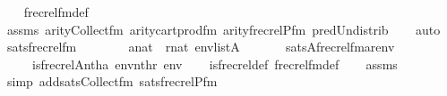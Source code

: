\begin{isabellebody}
%
\isadelimproof
\ \ %
\endisadelimproof
%
\isatagproof
{}\isamarkupfalse%
\ frecrel{\isacharunderscore}{\kern0pt}fm{\isacharunderscore}{\kern0pt}def\isanewline
\ \ \isamarkupfalse%
\ assms\ arity{\isacharunderscore}{\kern0pt}Collect{\isacharunderscore}{\kern0pt}fm\ arity{\isacharunderscore}{\kern0pt}cartprod{\isacharunderscore}{\kern0pt}fm\ arity{\isacharunderscore}{\kern0pt}frecrelP{\isacharunderscore}{\kern0pt}fm\ pred{\isacharunderscore}{\kern0pt}Un{\isacharunderscore}{\kern0pt}distrib\isanewline
\ \ \isamarkupfalse%
\ auto%
\endisatagproof
{\isafoldproof}%
%
\isadelimproof
\isanewline
%
\endisadelimproof
\isanewline
{}\isamarkupfalse%
\ sats{\isacharunderscore}{\kern0pt}frecrel{\isacharunderscore}{\kern0pt}fm\ {\isacharcolon}{\kern0pt}\isanewline
\ \ \isanewline
\ \ \ \ {\isachardoublequoteopen}a{\isasymin}nat{\isachardoublequoteclose}\ \ {\isachardoublequoteopen}r{\isasymin}nat{\isachardoublequoteclose}\ {\isachardoublequoteopen}env{\isasymin}list{\isacharparenleft}{\kern0pt}A{\isacharparenright}{\kern0pt}{\isachardoublequoteclose}\isanewline
\ \ \isanewline
\ \ \ \ {\isachardoublequoteopen}sats{\isacharparenleft}{\kern0pt}A{\isacharcomma}{\kern0pt}frecrel{\isacharunderscore}{\kern0pt}fm{\isacharparenleft}{\kern0pt}a{\isacharcomma}{\kern0pt}r{\isacharparenright}{\kern0pt}{\isacharcomma}{\kern0pt}env{\isacharparenright}{\kern0pt}\isanewline
\ \ \ \ {\isasymlongleftrightarrow}\ is{\isacharunderscore}{\kern0pt}frecrel{\isacharparenleft}{\kern0pt}{\isacharhash}{\kern0pt}{\isacharhash}{\kern0pt}A{\isacharcomma}{\kern0pt}nth{\isacharparenleft}{\kern0pt}a{\isacharcomma}{\kern0pt}\ env{\isacharparenright}{\kern0pt}{\isacharcomma}{\kern0pt}nth{\isacharparenleft}{\kern0pt}r{\isacharcomma}{\kern0pt}\ env{\isacharparenright}{\kern0pt}{\isacharparenright}{\kern0pt}{\isachardoublequoteclose}\isanewline
%
\isadelimproof
\ \ %
\endisadelimproof
%
\isatagproof
{}\isamarkupfalse%
\ is{\isacharunderscore}{\kern0pt}frecrel{\isacharunderscore}{\kern0pt}def\ frecrel{\isacharunderscore}{\kern0pt}fm{\isacharunderscore}{\kern0pt}def\isanewline
\ \ \isamarkupfalse%
\ assms\isanewline
\ \ \isamarkupfalse%
\ {\isacharparenleft}{\kern0pt}simp\ add{\isacharcolon}{\kern0pt}sats{\isacharunderscore}{\kern0pt}Collect{\isacharunderscore}{\kern0pt}fm\ sats{\isacharunderscore}{\kern0pt}frecrelP{\isacharunderscore}{\kern0pt}fm{\isacharparenright}{\kern0pt}%
\endisatagproof
{\isafoldproof}%
%
\isadelimproof
\isanewline
%
\endisadelimproof

\end{isabellebody}
